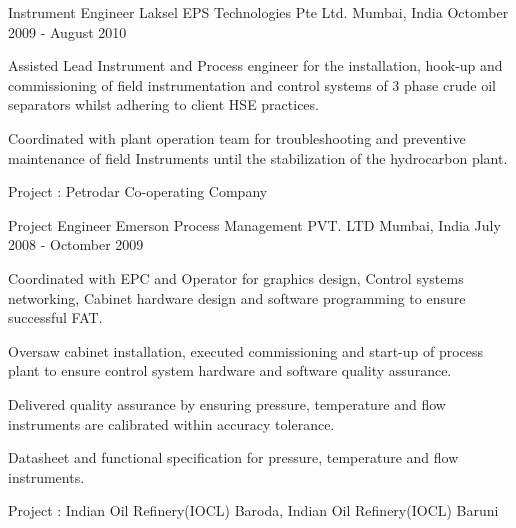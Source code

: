 \begin{cventries}
	\cventry
	{Instrument Engineer} %
	{Laksel EPS Technologies Pte Ltd.} %
	{Mumbai, India} %
	{Octomber 2009 - August 2010} %
	{ %
		\begin{cvitems}
			\item { Assisted Lead Instrument and Process engineer for the installation, hook-up and commissioning of field instrumentation and control systems of 3 phase crude oil separators whilst adhering to client HSE practices.} 
			\item { Coordinated with plant operation team for troubleshooting and preventive maintenance of field Instruments until the stabilization of the hydrocarbon plant.}
		\end{cvitems}
	}
	\cvprojentry
	{Project : }
	{Petrodar Co-operating Company}
\end{cventries}

\begin{cventries}
	\cventry
	{Project Engineer} %
	{Emerson Process Management PVT. LTD} %
	{Mumbai, India} %
	{July 2008 - Octomber 2009} %
	{ %
		\begin{cvitems}
			\item {Coordinated with EPC and Operator for graphics design, Control systems networking, Cabinet hardware design and software programming to ensure successful FAT. }
			\item {Oversaw cabinet installation, executed commissioning and start-up of process plant to ensure control system hardware and software quality assurance.}
			\item {Delivered quality assurance by ensuring pressure, temperature and flow instruments are calibrated within accuracy tolerance. }
			\item {Datasheet and functional specification for pressure, temperature and flow instruments. }	
		\end{cvitems}
	}
		\cvprojentry
	{Project : }
	{Indian Oil Refinery(IOCL) Baroda, Indian Oil Refinery(IOCL) Baruni}
\end{cventries}

